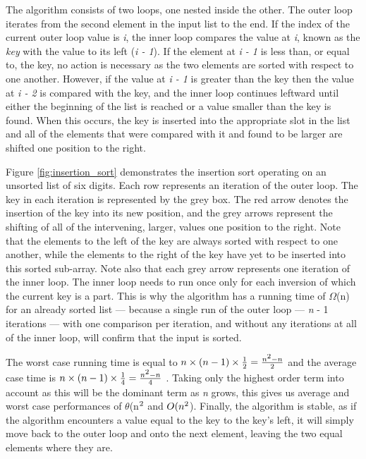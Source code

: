 \documentclass[12pt, a4paper]{article}
\begin{document}
The algorithm consists of two loops, one nested inside the other. The outer loop iterates from the second element in the input list to the end. If the index of the current outer loop value is \emph{i}, the inner loop compares the value at \emph{i}, known as the \emph{key} with the value to its left (\emph{i - 1}). If the element at \emph{i - 1} is less than, or equal to, the key, no action is necessary as the two elements are sorted with respect to one another. However, if the value at \emph{i - 1} is greater than the key then the value at \emph{i - 2} is compared with the key, and the inner loop continues leftward until either the beginning of the list is reached or a value smaller than the key is found. When this occurs, the key is inserted into the appropriate slot in the list and all of the elements that were compared with it and found to be larger are shifted one position to the right.

Figure \ref{fig:insertion_sort} demonstrates the insertion sort operating on an unsorted list of six digits. Each row represents an iteration of the outer loop. The key in each iteration is represented by the grey box. The red arrow denotes the insertion of the key into its new position, and the grey arrows represent the shifting of all of the intervening, larger, values one position to the right. Note that the elements to the left of the key are always sorted with respect to one another, while the elements to the right of the key have yet to be inserted into this sorted sub-array. Note also that each grey arrow represents one iteration of the inner loop. The inner loop needs to run once only for each inversion of which the current key is a part. This is why the algorithm has a running time of $\Omega$(n) for an already sorted list — because a single run of the outer loop — \emph{n} - 1 iterations — with one comparison per iteration, and without any iterations at all of the inner loop, will confirm that the input is sorted.

The worst case running time is equal to $n \times (n - 1) \times \frac{1}{2} = \frac{n\textsuperscript{2} - n}{2}$ and the average case time is  $n \times (n - 1) \times \frac{1}{4} = \frac{n\textsuperscript{2} - n}{4}$ \autocite{woltmann20:insertion}. Taking only the highest order term into account as this will be the dominant term as \emph{n} grows, this gives us average and worst case performances of $\theta$(n$\textsuperscript{2}$ and $O(n\textsuperscript{2}$). Finally, the algorithm is stable, as if the algorithm encounters a value equal to the key to the key's left, it will simply move back to the outer loop and onto the next element, leaving the two equal elements where they are.
\end{document}
